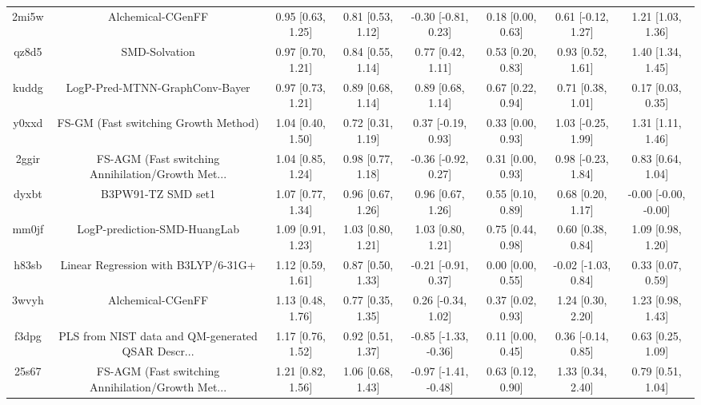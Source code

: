 \documentclass{article}
\begin{document}
\begin{center}
\begin{longtable}{|cccccccc|}
 2mi5w &                                  Alchemical-CGenFF &  0.95 [0.63, 1.25] &  0.81 [0.53, 1.12] &   -0.30 [-0.81, 0.23] &  0.18 [0.00, 0.63] &   0.61 [-0.12, 1.27] &     1.21 [1.03, 1.36] \\
 qz8d5 &                                      SMD-Solvation &  0.97 [0.70, 1.21] &  0.84 [0.55, 1.14] &     0.77 [0.42, 1.11] &  0.53 [0.20, 0.83] &    0.93 [0.52, 1.61] &     1.40 [1.34, 1.45] \\
 kuddg &                     LogP-Pred-MTNN-GraphConv-Bayer &  0.97 [0.73, 1.21] &  0.89 [0.68, 1.14] &     0.89 [0.68, 1.14] &  0.67 [0.22, 0.94] &    0.71 [0.38, 1.01] &     0.17 [0.03, 0.35] \\
 y0xxd &               FS-GM (Fast switching Growth Method) &  1.04 [0.40, 1.50] &  0.72 [0.31, 1.19] &    0.37 [-0.19, 0.93] &  0.33 [0.00, 0.93] &   1.03 [-0.25, 1.99] &     1.31 [1.11, 1.46] \\
 2ggir &  FS-AGM (Fast switching Annihilation/Growth Met... &  1.04 [0.85, 1.24] &  0.98 [0.77, 1.18] &   -0.36 [-0.92, 0.27] &  0.31 [0.00, 0.93] &   0.98 [-0.23, 1.84] &     0.83 [0.64, 1.04] \\
 dyxbt &                                 B3PW91-TZ SMD set1 &  1.07 [0.77, 1.34] &  0.96 [0.67, 1.26] &     0.96 [0.67, 1.26] &  0.55 [0.10, 0.89] &    0.68 [0.20, 1.17] &  -0.00 [-0.00, -0.00] \\
 mm0jf &                       LogP-prediction-SMD-HuangLab &  1.09 [0.91, 1.23] &  1.03 [0.80, 1.21] &     1.03 [0.80, 1.21] &  0.75 [0.44, 0.98] &    0.60 [0.38, 0.84] &     1.09 [0.98, 1.20] \\
 h83sb &                Linear Regression with B3LYP/6-31G+ &  1.12 [0.59, 1.61] &  0.87 [0.50, 1.33] &   -0.21 [-0.91, 0.37] &  0.00 [0.00, 0.55] &  -0.02 [-1.03, 0.84] &     0.33 [0.07, 0.59] \\
 3wvyh &                                  Alchemical-CGenFF &  1.13 [0.48, 1.76] &  0.77 [0.35, 1.35] &    0.26 [-0.34, 1.02] &  0.37 [0.02, 0.93] &    1.24 [0.30, 2.20] &     1.23 [0.98, 1.43] \\
 f3dpg &  PLS from NIST data and QM-generated QSAR Descr... &  1.17 [0.76, 1.52] &  0.92 [0.51, 1.37] &  -0.85 [-1.33, -0.36] &  0.11 [0.00, 0.45] &   0.36 [-0.14, 0.85] &     0.63 [0.25, 1.09] \\
 25s67 &  FS-AGM (Fast switching Annihilation/Growth Met... &  1.21 [0.82, 1.56] &  1.06 [0.68, 1.43] &  -0.97 [-1.41, -0.48] &  0.63 [0.12, 0.90] &    1.33 [0.34, 2.40] &     0.79 [0.51, 1.04] \\

\end{longtable}
\end{center}
\end{document}
